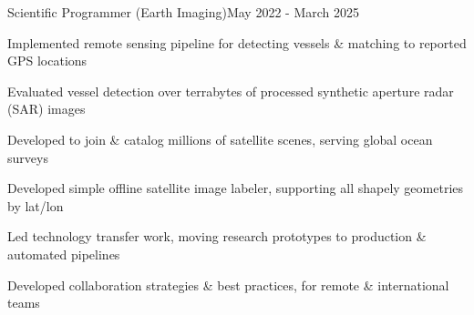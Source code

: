 \documentclass{article}
\newenvironment{**mylist}[2]{

\subsubsection*{#1\hfill#2}
  \small
  \begin{list}{}{}
    \setlength{\topsep}{.2pt}
   \setlength{\itemsep}{.8pt}
   \setlength{\parskip}{0pt}
   \setlength{\parsep}{0pt}}{\end{list}\normalsize}
\begin{document}
\begin{**mylist}{\href{https://globalfishingwatch.org/}{} \tabb Scientific Programmer (Earth Imaging)}{May 2022 - March 2025}
\item Implemented remote sensing pipeline for detecting vessels \& matching to reported GPS locations
\item Evaluated vessel detection over terrabytes of processed synthetic aperture radar (SAR) images
\item Developed  to join \& catalog millions of satellite scenes, serving global ocean surveys
\item Developed simple offline satellite image labeler, supporting all shapely geometries by lat/lon
\item Led technology transfer work, moving research prototypes to production \& automated pipelines
\item Developed collaboration strategies \& best practices, for remote \& international teams
\end{**mylist}
\end{document}
